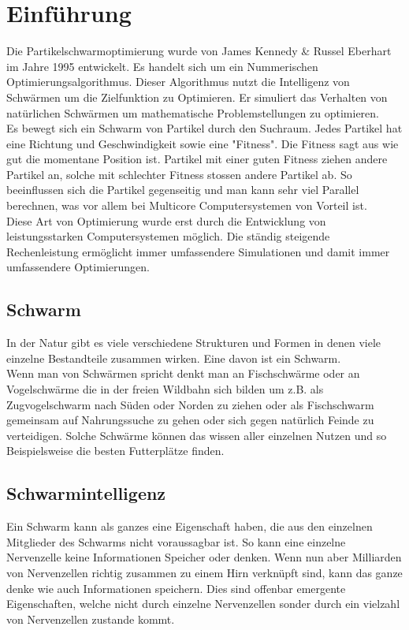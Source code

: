 \section{Einführung}
		Die Partikelschwarmoptimierung wurde von James Kennedy \& Russel Eberhart im Jahre 1995 entwickelt. Es handelt sich um ein Nummerischen Optimierungsalgorithmus. Dieser Algorithmus nutzt die Intelligenz von Schwärmen um die Zielfunktion zu Optimieren. Er simuliert das Verhalten von natürlichen Schwärmen um mathematische Problemstellungen zu optimieren.\\
		Es bewegt sich ein Schwarm von Partikel durch den Suchraum. Jedes Partikel hat eine Richtung und Geschwindigkeit sowie eine "Fitness". Die Fitness sagt aus wie gut die momentane Position ist. Partikel mit einer guten Fitness ziehen andere Partikel an, solche mit schlechter Fitness stossen andere Partikel ab. So beeinflussen sich die Partikel gegenseitig und man kann sehr viel Parallel berechnen, was vor allem bei Multicore Computersystemen von Vorteil ist. \\
		Diese Art von Optimierung wurde erst durch die Entwicklung von leistungsstarken Computersystemen möglich. Die ständig steigende Rechenleistung ermöglicht immer umfassendere Simulationen und damit immer umfassendere Optimierungen.
		\subsection{Schwarm}
		In der Natur gibt es viele verschiedene Strukturen und Formen in denen viele einzelne Bestandteile zusammen wirken. Eine davon ist ein Schwarm.\\
		Wenn man von Schwärmen spricht denkt man an Fischschwärme oder an Vogelschwärme die in der freien Wildbahn sich bilden um z.B. als Zugvogelschwarm nach Süden oder Norden zu ziehen oder als Fischschwarm gemeinsam auf Nahrungssuche zu gehen oder sich gegen natürlich Feinde zu verteidigen. Solche Schwärme können das wissen aller einzelnen Nutzen und so Beispielsweise die besten Futterplätze finden.
		\subsection{Schwarmintelligenz}
		Ein Schwarm kann als ganzes eine Eigenschaft haben, die aus den einzelnen Mitglieder des Schwarms nicht voraussagbar ist. So kann eine einzelne Nervenzelle keine Informationen Speicher oder denken. Wenn nun aber Milliarden von Nervenzellen richtig zusammen zu einem Hirn verknüpft sind, kann das ganze denke wie auch Informationen speichern. Dies sind offenbar emergente Eigenschaften, welche nicht durch einzelne Nervenzellen sonder durch ein vielzahl von Nervenzellen zustande kommt.
